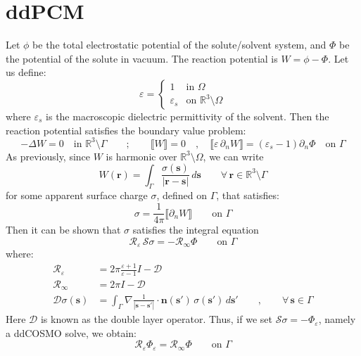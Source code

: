 \documentclass[12pt,letterpaper,oneside]{article}
\theoremstyle{definition}
\begin{document}
\section{ddPCM}
Let $\phi$ be the total electrostatic potential of the solute/solvent system, and $\Phi$ be the potential of the solute in vacuum. The reaction potential is $W = \phi - \Phi$. Let us define:
\[
\varepsilon = 
\begin{cases}
1 & \text{in }\Omega \\
\varepsilon_s & \text{on }\mathbb{R}^3 \setminus \Omega
\end{cases}
\]
where $\varepsilon_s$ is the macroscopic dielectric permittivity of the solvent. Then the reaction potential satisfies the boundary value problem:
\[
-\Delta W = 0 \quad \text{in } \mathbb{R}^3 \setminus \Gamma \qquad ; \qquad \llbracket W \rrbracket = 0 \quad  , \quad \llbracket \varepsilon \, \partial_n W \rrbracket = (\varepsilon_s - 1) \partial_n \Phi \quad \text{on }\Gamma
\]
As previously, since $W$ is harmonic over $\mathbb{R}^3 \setminus \Omega$, we can write
\[
W(\boldsymbol{r}) = \int_\Gamma \frac{\sigma(\boldsymbol{s})}{| \boldsymbol{r} - \boldsymbol{s}|} \, d\boldsymbol{s} \qquad \forall \, \boldsymbol{r} \in \mathbb{R}^3 \setminus \Gamma
\]
for some apparent surface charge $\sigma$, defined on $\Gamma$, that satisfies:
\[
\sigma = \frac{1}{4\pi} \llbracket \partial_n W \rrbracket \qquad \text{on }\Gamma
\]
Then it can be shown that $\sigma$ satisfies the integral equation
\[
\mathcal{R}_\varepsilon \, \mathcal{S} \sigma = -\mathcal{R}_\infty \Phi \qquad \text{on }\Gamma
\]
where:
\begin{align*}
\mathcal{R}_\varepsilon & = 2 \pi \frac{\varepsilon + 1}{\varepsilon - 1} I - \mathcal{D} \\
\mathcal{R}_\infty & = 2 \pi I - \mathcal{D} \\
\mathcal{D} \sigma(\boldsymbol{s}) & = \int_\Gamma \nabla \frac{1}{| \boldsymbol{s} - \boldsymbol{s}' |} \cdot \boldsymbol{n} (\boldsymbol{s}') \,\sigma(\boldsymbol{s}') \, d\boldsymbol{s}' \qquad ,\qquad \forall \, \boldsymbol{s} \in \Gamma
\end{align*}
Here $\mathcal{D}$ is known as the double layer operator.
Thus, if we set $\mathcal{S} \sigma = -\Phi_\varepsilon$, namely a ddCOSMO solve, we obtain:
\begin{equation}\label{eq:3}
\mathcal{R}_\varepsilon \Phi_\varepsilon = \mathcal{R}_\infty \Phi \qquad \text{on }\Gamma
\end{equation}
\end{document}
